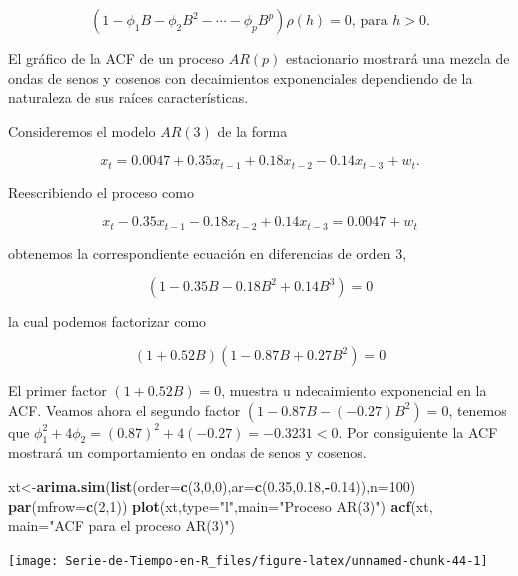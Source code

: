 \documentclass[12pt,]{krantz}
\makeatletter
\newenvironment{Shaded}{\begin{snugshade}}{\end{snugshade}}
\newcommand{\KeywordTok}[1]{\textcolor[rgb]{0.13,0.29,0.53}{\textbf{#1}}}
\newcommand{\DataTypeTok}[1]{\textcolor[rgb]{0.13,0.29,0.53}{#1}}
\newcommand{\DecValTok}[1]{\textcolor[rgb]{0.00,0.00,0.81}{#1}}
\newcommand{\FloatTok}[1]{\textcolor[rgb]{0.00,0.00,0.81}{#1}}
\newcommand{\StringTok}[1]{\textcolor[rgb]{0.31,0.60,0.02}{#1}}
\newcommand{\OperatorTok}[1]{\textcolor[rgb]{0.81,0.36,0.00}{\textbf{#1}}}
\newcommand{\NormalTok}[1]{#1}
\newenvironment{kframe}{%
\medskip{}
\setlength{\fboxsep}{.8em}
 \def\at@end@of@kframe{}%
 \ifinner\ifhmode%
  \def\at@end@of@kframe{\end{minipage}}%
  \begin{minipage}{\columnwidth}%
 \fi\fi%
 \def\FrameCommand##1{\hskip\@totalleftmargin \hskip-\fboxsep
 \colorbox{shadecolor}{##1}\hskip-\fboxsep
     \hskip-\linewidth \hskip-\@totalleftmargin \hskip\columnwidth}%
 \MakeFramed {\advance\hsize-\width
   \@totalleftmargin\z@ \linewidth\hsize
   \@setminipage}}%
 {\par\unskip\endMakeFramed%
 \at@end@of@kframe}
\renewenvironment{Shaded}{\begin{kframe}}{\end{kframe}}
\theoremstyle{definition}
\theoremstyle{definition}
\theoremstyle{definition}
\theoremstyle{remark}
\let\BeginKnitrBlock\begin \let\EndKnitrBlock\end
\makeatother
\begin{document}
\[(1-\phi_1B-\phi_2B^2-\cdots-\phi_pB^p)\rho(h)=0\text{, para }h>0.\]

El gráfico de la ACF de un proceso \(AR(p)\) estacionario mostrará una
mezcla de ondas de senos y cosenos con decaimientos exponenciales
dependiendo de la naturaleza de sus raíces características.

\BeginKnitrBlock{example}
\protect\hypertarget{exm:unnamed-chunk-43}{}{\label{exm:unnamed-chunk-43}
}Consideremos el modelo \(AR(3)\) de la forma

\[x_t=0.0047+0.35x_{t-1}+0.18x_{t-2}-0.14x_{t-3}+w_t.\]

Reescribiendo el proceso como

\[x_t-0.35x_{t-1}-0.18x_{t-2}+0.14x_{t-3}=0.0047+w_t\]

obtenemos la correspondiente ecuación en diferencias de orden 3,

\[(1-0.35B-0.18B^2+0.14B^3)=0\]

la cual podemos factorizar como

\[(1+0.52B)(1-0.87B+0.27B^2)=0\]

El primer factor \((1+0.52B)=0\), muestra u ndecaimiento exponencial en
la ACF. Veamos ahora el segundo factor \((1-0.87B-(-0.27)B^2)=0\),
tenemos que \(\phi_1^2+4\phi_2=(0.87)^2+4(-0.27)=-0.3231<0\). Por
consiguiente la ACF mostrará un comportamiento en ondas de senos y
cosenos.
\EndKnitrBlock{example}

\begin{Shaded}
\begin{Highlighting}[]
\NormalTok{xt<-}\KeywordTok{arima.sim}\NormalTok{(}\KeywordTok{list}\NormalTok{(}\DataTypeTok{order=}\KeywordTok{c}\NormalTok{(}\DecValTok{3}\NormalTok{,}\DecValTok{0}\NormalTok{,}\DecValTok{0}\NormalTok{),}\DataTypeTok{ar=}\KeywordTok{c}\NormalTok{(}\FloatTok{0.35}\NormalTok{,}\FloatTok{0.18}\NormalTok{,}\OperatorTok{-}\FloatTok{0.14}\NormalTok{)),}\DataTypeTok{n=}\DecValTok{100}\NormalTok{)}
\KeywordTok{par}\NormalTok{(}\DataTypeTok{mfrow=}\KeywordTok{c}\NormalTok{(}\DecValTok{2}\NormalTok{,}\DecValTok{1}\NormalTok{))}
\KeywordTok{plot}\NormalTok{(xt,}\DataTypeTok{type=}\StringTok{"l"}\NormalTok{,}\DataTypeTok{main=}\StringTok{"Proceso AR(3)"}\NormalTok{)}
\KeywordTok{acf}\NormalTok{(xt, }\DataTypeTok{main=}\StringTok{"ACF para el proceso AR(3)"}\NormalTok{)}
\end{Highlighting}
\end{Shaded}

\begin{center}\texttt{[image: Serie-de-Tiempo-en-R\_files/figure-latex/unnamed-chunk-44-1]} \end{center}

\cleardoublepage 

\appendix {}




\backmatter
\printindex
\end{document}
